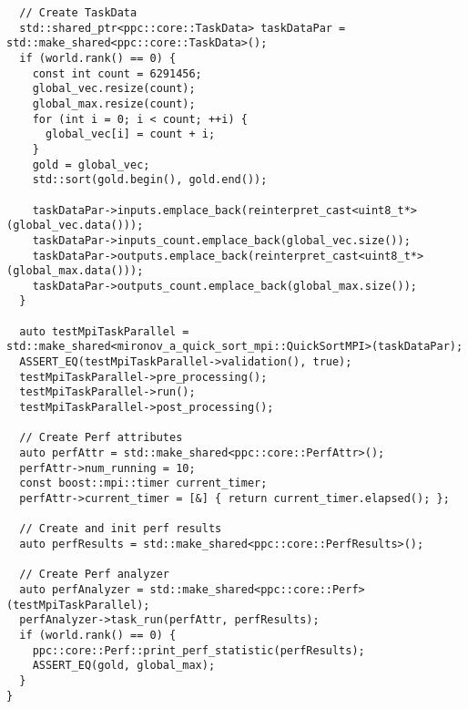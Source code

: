 \documentclass[12pt]{article}
\begin{document}
\begin{lstlisting}
  // Create TaskData
  std::shared_ptr<ppc::core::TaskData> taskDataPar = std::make_shared<ppc::core::TaskData>();
  if (world.rank() == 0) {
    const int count = 6291456;
    global_vec.resize(count);
    global_max.resize(count);
    for (int i = 0; i < count; ++i) {
      global_vec[i] = count + i;
    }
    gold = global_vec;
    std::sort(gold.begin(), gold.end());

    taskDataPar->inputs.emplace_back(reinterpret_cast<uint8_t*>(global_vec.data()));
    taskDataPar->inputs_count.emplace_back(global_vec.size());
    taskDataPar->outputs.emplace_back(reinterpret_cast<uint8_t*>(global_max.data()));
    taskDataPar->outputs_count.emplace_back(global_max.size());
  }

  auto testMpiTaskParallel = std::make_shared<mironov_a_quick_sort_mpi::QuickSortMPI>(taskDataPar);
  ASSERT_EQ(testMpiTaskParallel->validation(), true);
  testMpiTaskParallel->pre_processing();
  testMpiTaskParallel->run();
  testMpiTaskParallel->post_processing();

  // Create Perf attributes
  auto perfAttr = std::make_shared<ppc::core::PerfAttr>();
  perfAttr->num_running = 10;
  const boost::mpi::timer current_timer;
  perfAttr->current_timer = [&] { return current_timer.elapsed(); };

  // Create and init perf results
  auto perfResults = std::make_shared<ppc::core::PerfResults>();

  // Create Perf analyzer
  auto perfAnalyzer = std::make_shared<ppc::core::Perf>(testMpiTaskParallel);
  perfAnalyzer->task_run(perfAttr, perfResults);
  if (world.rank() == 0) {
    ppc::core::Perf::print_perf_statistic(perfResults);
    ASSERT_EQ(gold, global_max);
  }
}

\end{lstlisting}
\end{document}
